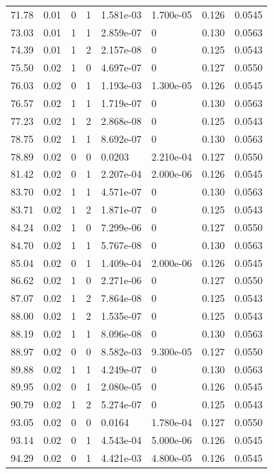 \documentclass[preview]{standalone}
\begin{document}
{{{\begin{tabular}{L{1.2cm}C{1.2cm} C{0.3cm}C{0.5cm} C{1.4cm}C{1.4cm} C{1.4cm}C{1.4cm}}
  71.78  &  0.01  & 0     &  1 &  1.581e-03  & 1.700e-05  & 0.126 &  0.0545   \\ 
  73.03  &  0.01  & 1     &  1 &  2.859e-07  & 0  & 0.130 &  0.0563   \\ 
  74.39  &  0.01  & 1     &  2 &  2.157e-08  & 0  & 0.125 &  0.0543   \\ 
  75.50  &  0.02  & 1     &  0 &  4.697e-07  & 0  & 0.127 &  0.0550   \\ 
  76.03  &  0.02  & 0     &  1 &  1.193e-03  & 1.300e-05  & 0.126 &  0.0545   \\ 
  76.57  &  0.02  & 1     &  1 &  1.719e-07  & 0  & 0.130 &  0.0563   \\ 
  77.23  &  0.02  & 1     &  2 &  2.868e-08  & 0  & 0.125 &  0.0543   \\ 
  78.75  &  0.02  & 1     &  1 &  8.692e-07  & 0  & 0.130 &  0.0563   \\ 
  78.89  &  0.02  & 0     &  0 &  0.0203  & 2.210e-04  & 0.127 &  0.0550   \\ 
  81.42  &  0.02  & 0     &  1 &  2.207e-04  & 2.000e-06  & 0.126 &  0.0545   \\ 
  83.70  &  0.02  & 1     &  1 &  4.571e-07  & 0  & 0.130 &  0.0563   \\ 
  83.71  &  0.02  & 1     &  2 &  1.871e-07  & 0  & 0.125 &  0.0543   \\ 
  84.24  &  0.02  & 1     &  0 &  7.299e-06  & 0  & 0.127 &  0.0550   \\ 
  84.70  &  0.02  & 1     &  1 &  5.767e-08  & 0  & 0.130 &  0.0563   \\ 
  85.04  &  0.02  & 0     &  1 &  1.409e-04  & 2.000e-06  & 0.126 &  0.0545   \\ 
  86.62  &  0.02  & 1     &  0 &  2.271e-06  & 0  & 0.127 &  0.0550   \\ 
  87.07  &  0.02  & 1     &  2 &  7.864e-08  & 0  & 0.125 &  0.0543   \\ 
  88.00  &  0.02  & 1     &  2 &  1.535e-07  & 0  & 0.125 &  0.0543   \\ 
  88.19  &  0.02  & 1     &  1 &  8.096e-08  & 0  & 0.130 &  0.0563   \\ 
  88.97  &  0.02  & 0     &  0 &  8.582e-03  & 9.300e-05  & 0.127 &  0.0550   \\ 
  89.88  &  0.02  & 1     &  1 &  4.249e-07  & 0  & 0.130 &  0.0563   \\ 
  89.95  &  0.02  & 0     &  1 &  2.080e-05  & 0  & 0.126 &  0.0545   \\ 
  90.79  &  0.02  & 1     &  2 &  5.274e-07  & 0  & 0.125 &  0.0543   \\ 
  93.05  &  0.02  & 0     &  0 &  0.0164  & 1.780e-04  & 0.127 &  0.0550   \\ 
  93.14  &  0.02  & 0     &  1 &  4.543e-04  & 5.000e-06  & 0.126 &  0.0545   \\ 
  94.29  &  0.02  & 0     &  1 &  4.421e-03  & 4.800e-05  & 0.126 &  0.0545   \\ 
\hline 
\end{tabular} 

}}}
\end{document}
